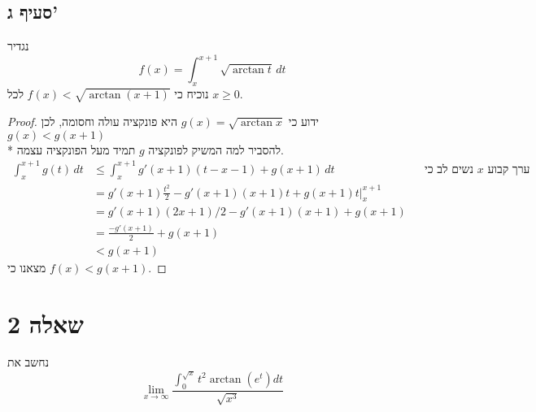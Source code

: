 \subsection{סעיף ג'}
נגדיר
\[
	f(x) = \int_{x}^{x + 1} \sqrt{\arctan t} \, dt
\]
נוכיח כי $f(x) < \sqrt{\arctan(x + 1)}$ לכל $x \ge 0$.
\begin{proof}
	ידוע כי $g(x) = \sqrt{\arctan x}$ היא פונקציה עולה וחסומה, לכן $g(x) < g(x + 1)$ \\*
	להסביר למה המשיק לפונקציה $g$ תמיד מעל הפונקציה עצמה.
	\begin{align*}
		\int_{x}^{x + 1} g(t) \, dt
		& \le
		\int_{x}^{x + 1} g'(x + 1)(t - x - 1) + g(x + 1) \, dt && \text{נשים לב כי $x$ ערך קבוע באינטגרל} \\
		& = g'(x + 1) \frac{t^2}{2} - g'(x + 1)(x + 1)t + g(x + 1) t \Big|_x^{x + 1} \\
		& = g'(x + 1) (2x + 1)/2 - g'(x + 1) (x + 1) + g(x + 1) \\
		& = \frac{-g'(x + 1)}{2} + g(x + 1) \\
		& < g(x + 1)
	\end{align*}
	מצאנו כי $f(x) < g(x + 1)$.
\end{proof}

\section{שאלה 2}
נחשב את
\[
	\lim_{x \to \infty} \frac{\displaystyle\int_0^{\sqrt{x}} t^2 \arctan(e^t) dt}{\sqrt{x^3}}
\]

